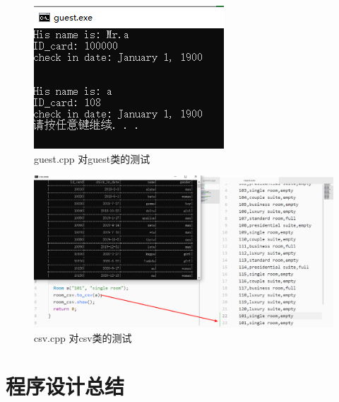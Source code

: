 \documentclass[UTF8]{ctexart}
\begin{document}
  \begin{figure}[H]
      \centering
      \includegraphics[scale=1]{test_guest}
      \caption{guest.cpp 对guest类的测试}
      \label{fig:test_guest}
    \end{figure}
  \begin{figure}[H]
      \centering
      \includegraphics[scale=0.4]{test_csv}
      \caption{csv.cpp 对csv类的测试}
      \label{fig:test_csv}
    \end{figure}
\section{程序设计总结}

\nocite{cpp_primier}%
\nocite{cpp_document}
\nocite{google_style}
\end{document}
